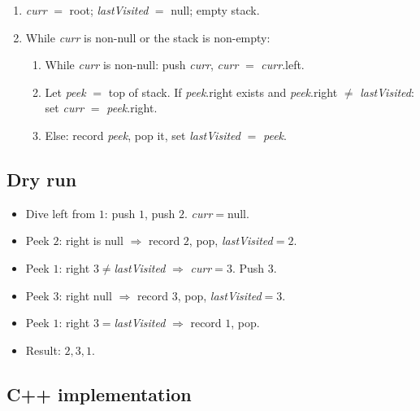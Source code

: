 \begin{enumerate}
  \item \textit{curr} $=$ root; \textit{lastVisited} $=$ null; empty
        stack.
  \item While \textit{curr} is non-null or the stack is non-empty:
  \begin{enumerate}
    \item While \textit{curr} is non-null: push \textit{curr},
          \textit{curr} $=$ \textit{curr}.left.
    \item Let \textit{peek} $=$ top of stack. If \textit{peek}.right
          exists and \textit{peek}.right $\ne$ \textit{lastVisited}: set
          \textit{curr} $=$ \textit{peek}.right.
    \item Else: record \textit{peek}, pop it, set \textit{lastVisited}
          $=$ \textit{peek}.
  \end{enumerate}
\end{enumerate}

\subsection*{Dry run}


\begin{itemize}
  \item Dive left from $1$: push $1$, push $2$. \textit{curr}$=$null.
  \item Peek $2$: right is null $\Rightarrow$ record $2$, pop,
        \textit{lastVisited}$=2$.
  \item Peek $1$: right $3\ne$\textit{lastVisited} $\Rightarrow$
        \textit{curr}$=3$. Push $3$.
  \item Peek $3$: right null $\Rightarrow$ record $3$, pop,
        \textit{lastVisited}$=3$.
  \item Peek $1$: right $3=$\textit{lastVisited} $\Rightarrow$ record $1$,
        pop.
  \item Result: $2,3,1$.
\end{itemize}

\subsection*{C++ implementation}

